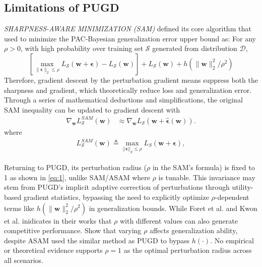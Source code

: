 \documentclass[10pt,twocolumn,letterpaper]{article}
\begin{document}
\subsection{Limitations of PUGD}
\label{subsec:3.1}
\textit{SHARPNESS-AWARE MINIMIZATION (SAM)} \cite{foret2021sharpnessawareminimizationefficientlyimproving} defined its core algorithm that used to minimize the PAC-Bayesian generalization error upper bound as:
For any $\rho>0$, with high probability over training set $\mathcal{S}$ generated from distribution $\mathscr{D}$, 
$$[\max_{\|\boldsymbol{\epsilon}\|_2\leq \rho }L_\mathcal{S}(\boldsymbol{w}+\boldsymbol{\epsilon}) - L_\mathcal{S}(\boldsymbol{w})] + L_\mathcal{S}(\boldsymbol{w}) + h(\|\boldsymbol{w}\|_2^2/\rho^2)$$ Therefore, gradient descent by the perturbation gradient means suppress both the sharpness and gradient, which theoretically reduce loss and generalization error. Through a series of mathematical deductions and simplifications, the original SAM inequality can be updated to gradient descent with 
\begin{align*}
\nabla_{\boldsymbol{w}} L^{SAM}_\mathcal{S}(\boldsymbol{w}) & \approx \nabla_{\boldsymbol{w}} L_\mathcal{S}(\boldsymbol{w} + \hat{\boldsymbol{\epsilon}}(\boldsymbol{w})).
\end{align*}
where \begin{align*}
	L^{SAM}_\mathcal{S}(\boldsymbol{w}) \triangleq \max_{||\boldsymbol{\epsilon}||_p\leq \rho} L_S(\boldsymbol{w}+\boldsymbol{\epsilon}),
\end{align*} 

Returning to PUGD, its perturbation radius ($\rho$ in the SAM's formula) is fixed to 1 as shown in \eqref{eq:1}, unlike SAM/ASAM where $\rho$ is tunable. This invariance may stem from PUGD's implicit adaptive correction of perturbations through utility-based gradient statistics, bypassing the need to explicitly optimize $\rho$-dependent terms like $h(\|\boldsymbol{w}\|_2^2/\rho^2)$ in generalization bounds. While Foret et al.\cite{foret2021sharpnessawareminimizationefficientlyimproving} and Kwon et al. \cite{kwon2021asamadaptivesharpnessawareminimization} inidicates in their works that $\rho$ with different values can also generate competitive performance. Show that varying $\rho$ affects generalization ability, despite ASAM used the similar method as PUGD to bypass $h(\cdot)$. No empirical or theoretical evidence supports $\rho = 1$ as the optimal perturbation radius across all scenarios.
\end{document}
